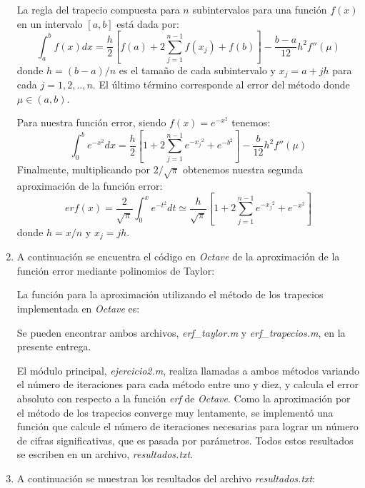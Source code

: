 \documentclass[titlepage,a4paper]{article}
\begin{document}
\begin{enumerate}[label=(\alph*)]
			La regla del trapecio compuesta para $n$ subintervalos para una función $f(x)$ en un intervalo $[a,b]$ está dada por:
				\begin{equation}
					\int_{a}^{b}f(x)dx = \frac{h}{2}\left[f(a) + 2\sum_{j=1}^{n-1}f(x_{j})+f(b)\right]-\frac{b-a}{12}h^{2}f''(\mu)\label{eq:12}
				\end{equation}
			donde $h=(b-a)/n$ es el tamaño de cada subintervalo y $x_j = a + jh$ para cada $j=1,2,..,n$. El último 
			término corresponde al error del método donde $\mu \in (a,b)$.

			Para nuestra función error, siendo $f(x) = e^{-x^2}$ tenemos:
				\begin{equation}
					\int_{0}^{b}e^{-x^2}dx = \frac{h}{2}\left[1 + 2\sum_{j=1}^{n-1}e^{-{x_j}^2}+e^{-b^2}\right]-\frac{b}{12}h^{2}f''(\mu)
				\end{equation}
			Finalmente, multiplicando por $2/\sqrt{\pi}$ obtenemos nuestra segunda aproximación de la función error:
				\begin{equation}
					erf(x) = \frac{2}{\sqrt{\pi}}\int_{0}^{x}e^{-t^2}dt \simeq \frac{h}{\sqrt{\pi}}\left[1 + 2\sum_{j=1}^{n-1}e^{-{x_j}^2}+e^{-x^2}\right]
				\end{equation}
			donde $h = x/n$ y $x_j = jh$.
		
		\item
			A continuación se encuentra el código en \emph{Octave} de la aproximación de la función error mediante polinomios de Taylor:
			
			
			La función para la aproximación utilizando el método de los trapecios implementada en \emph{Octave} es:
			

			Se pueden encontrar ambos archivos, \textit{erf\_taylor.m} y \textit{erf\_trapecios.m}, en la presente entrega.

			El módulo principal, \textit{ejercicio2.m}, realiza llamadas a ambos métodos variando el número de iteraciones para 
			cada método entre uno y diez, y calcula el error absoluto con respecto a la función \emph{erf} de \emph{Octave}.
			Como la aproximación por el método de los trapecios converge muy lentamente, se implementó una función que calcule el número 
			de iteraciones necesarias para lograr un número de cifras significativas, que es pasada por parámetros.
			Todos estos resultados se escriben en un archivo, \emph{resultados.txt}.
			
		
		\item
			A continuación se muestran los resultados del archivo \emph{resultados.txt}:
			

	\end{enumerate}
\end{document}

